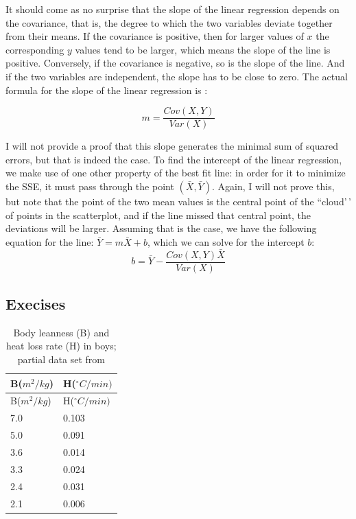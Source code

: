 \documentclass[
]{book}
\theoremstyle{definition}
\theoremstyle{definition}
\theoremstyle{definition}
\theoremstyle{remark}
\begin{document}
It should come as no surprise that the slope of the linear regression depends on the covariance, that is, the degree to which the two variables deviate together from their means. If the covariance is positive, then for larger values of \(x\) the corresponding \(y\) values tend to be larger, which means the slope of the line is positive. Conversely, if the covariance is negative, so is the slope of the line. And if the two variables are independent, the slope has to be close to zero. The actual formula for the slope of the linear regression is \citep{whitlock_analysis_2008}:

\begin{equation}
m = \frac{Cov(X,Y)}{Var(X)}
\end{equation}

I will not provide a proof that this slope generates the minimal sum of squared errors, but that is indeed the case. To find the intercept of the linear regression, we make use of one other property of the best fit line: in order for it to minimize the SSE, it must pass through the point \((\bar X, \bar Y)\). Again, I will not prove this, but note that the point of the two mean values is the central point of the ``cloud'\,' of points in the scatterplot, and if the line missed that central point, the deviations will be larger. Assuming that is the case, we have the following equation for the line: \(\bar Y = m\bar X + b\), which we can solve for the   intercept \(b\):
\begin{equation}
b = \bar Y - \frac{Cov(X,Y) \bar X}{Var(X)}
\end{equation}

\hypertarget{execises}{%
\subsection{Execises}\label{execises}}

\begin{longtable}[]{@{}ll@{}}
\caption{Body leanness (B) and heat loss rate (H) in boys; partial data set from \citep{sloan_cooling_1973}}\tabularnewline
\toprule
B(\(m^2/kg\)) & H(\(^\circ C /min)\)\tabularnewline
\midrule
\endfirsthead
\toprule
B(\(m^2/kg\)) & H(\(^\circ C /min)\)\tabularnewline
\midrule
\endhead
7.0 & 0.103\tabularnewline
5.0 & 0.091\tabularnewline
3.6 & 0.014\tabularnewline
3.3 & 0.024\tabularnewline
2.4 & 0.031\tabularnewline
2.1 & 0.006\tabularnewline
\bottomrule
\end{longtable}
\end{document}
